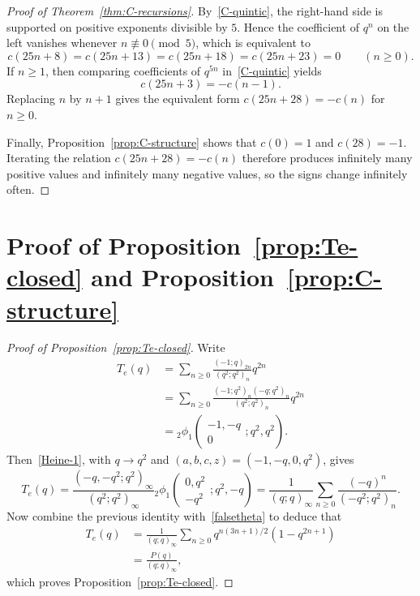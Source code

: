 \documentclass[reqno]{amsart}
\theoremstyle{plain}
\theoremstyle{definition}
\theoremstyle{remark}
\numberwithin{equation}{section}
\newcommand{\qpoch}[2]{(#1;#2)_\infty}
\newcommand{\qpochn}[3]{(#1;#2)_{#3}}
\newcommand{\fr}{\frac}
\begin{document}
\begin{proof}[Proof of Theorem~\ref{thm:C-recursions}]
By~\eqref{C-quintic}, the right-hand side is supported on positive exponents divisible by $5$. Hence the coefficient of $q^n$ on the left vanishes whenever $n\not\equiv 0\pmod{5}$, which is equivalent to
\[
c(25n+8)=c(25n+13)=c(25n+18)=c(25n+23)=0
\qquad(n\ge 0).
\]
If $n\ge 1$, then comparing coefficients of $q^{5n}$ in~\eqref{C-quintic} yields
\[
c(25n+3)=-c(n-1).
\]
Replacing $n$ by $n+1$ gives the equivalent form $c(25n+28)=-c(n)$ for $n\ge 0$.

Finally, Proposition~\ref{prop:C-structure} shows that $c(0)=1$ and $c(28)=-1$. Iterating the relation $c(25n+28)=-c(n)$ therefore produces infinitely many positive values and infinitely many negative values, so the signs change infinitely often.
\end{proof}
%
\section{Proof of Proposition~\ref{prop:Te-closed} and Proposition~\ref{prop:C-structure}}\label{sec:proof-Te-C}
%
\begin{proof}[Proof of Proposition~\ref{prop:Te-closed}]
Write
\begin{align*}
T_e(q) &= \sum_{n\geq 0}\fr{(-1;q)_{2n}}{(q^2;q^2)_n} q^{2n} \\
&=\sum_{n\geq 0}\fr{(-1;q^2)_n (-q;q^2)_n}{(q^2;q^2)_n} q^{2n} \\
&= {}_2\phi_1\!\left(\begin{matrix}-1,-q\\ 0\end{matrix};q^2,q^2\right).
\end{align*}
Then~\eqref{Heine-1}, with $q\to q^2$ and $(a,b,c,z)=(-1,-q,0,q^2)$, gives
\[
T_e(q)=\frac{\qpoch{-q,-q^2}{q^2}}{\qpoch{q^2}{q^2}}
{}_2\phi_1\!\left(\begin{matrix}0,q^2\\ -q^2\end{matrix};q^2,-q\right)
=\frac{1}{\qpoch{q}{q}}\sum_{n\ge 0}\frac{(-q)^n}{\qpochn{-q^2}{q^2}{n}}.
\]
Now combine the previous identity with~\eqref{falsetheta} to deduce that
\begin{align*}
T_e(q)&=\frac{1}{\qpoch{q}{q}} \sum_{n\ge 0} q^{n(3n+1)/2}(1-q^{2n+1}) \\
&=\frac{P(q)}{\qpoch{q}{q}},
\end{align*}
which proves Proposition~\ref{prop:Te-closed}.
\end{proof}
\end{document}
